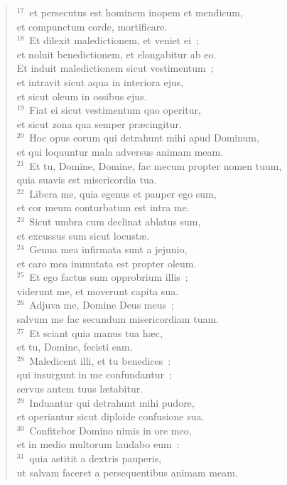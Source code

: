 \begin{flushleft}
\begin{verse}
${}^{17}$~et persecutus est hominem inopem et mendicum,\\ et compunctum corde, mortificare.\\
${}^{18}$~Et dilexit maledictionem, et veniet ei~;\\ et noluit benedictionem, et elongabitur ab eo.\\ Et induit maledictionem sicut vestimentum~;\\ et intravit sicut aqua in interiora ejus,\\ et sicut oleum in ossibus ejus.\\
${}^{19}$~Fiat ei sicut vestimentum quo operitur,\\ et sicut zona qua semper pr\ae cingitur.\\
${}^{20}$~Hoc opus eorum qui detrahunt mihi apud Dominum,\\ et qui loquuntur mala adversus animam meam.\\
${}^{21}$~Et tu, Domine, Domine, fac mecum propter nomen tuum,\\ quia suavis est misericordia tua.\\
${}^{22}$~Libera me, quia egenus et pauper ego sum,\\ et cor meum conturbatum est intra me.\\
${}^{23}$~Sicut umbra cum declinat ablatus sum,\\ et excussus sum sicut locust\ae .\\
${}^{24}$~Genua mea infirmata sunt a jejunio,\\ et caro mea immutata est propter oleum.\\
${}^{25}$~Et ego factus sum opprobrium illis~;\\ viderunt me, et moverunt capita sua.\\
${}^{26}$~Adjuva me, Domine Deus meus~;\\ salvum me fac secundum misericordiam tuam.\\
${}^{27}$~Et sciant quia manus tua h\ae c,\\ et tu, Domine, fecisti eam.\\
${}^{28}$~Maledicent illi, et tu benedices~:\\ qui insurgunt in me confundantur~;\\ servus autem tuus l\ae tabitur.\\
${}^{29}$~Induantur qui detrahunt mihi pudore,\\ et operiantur sicut diploide confusione sua.\\
${}^{30}$~Confitebor Domino nimis in ore meo,\\ et in medio multorum laudabo eum~:\\
${}^{31}$~quia astitit a dextris pauperis,\\ ut salvam faceret a persequentibus animam meam.\end{verse}\end{flushleft}



